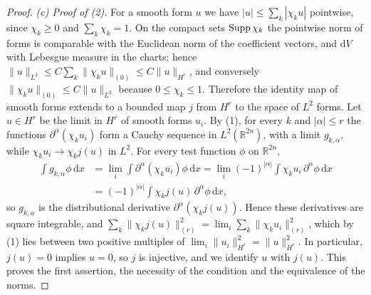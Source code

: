 \begin{proof}
\emph{(c) Proof of (2).} For a smooth form $u$ we have $|u|\leq\sum_k|\chi_ku|$ pointwise, since $\chi_k\geq0$ and $\sum_k\chi_k=1$. On the compact sets $\operatorname{Supp}\chi_k$ the pointwise norm of forms is comparable with the Euclidean norm of the coefficient vectors, and $\mathrm dV$ with Lebesgue measure in the charts; hence $\|u\|_{L^2}\leq C\sum_k\|\chi_ku\|_{(0)}\leq C\|u\|_{H^r}$, and conversely $\|\chi_ku\|_{(0)}\leq C\|u\|_{L^2}$ because $0\leq\chi_k\leq1$. Therefore the identity map of smooth forms extends to a bounded map $j$ from $H^r$ to the space of $L^2$ forms. Let $u\in H^r$ be the limit in $H^r$ of smooth forms $u_i$. By (1), for every $k$ and $|\alpha|\leq r$ the functions $\partial^\alpha(\chi_ku_i)$ form a Cauchy sequence in $L^2(\mathbb R^{2n})$, with a limit $g_{k,\alpha}$, while $\chi_ku_i\to\chi_kj(u)$ in $L^2$. For every test function $\phi$ on $\mathbb R^{2n}$,
\[
 \begin{aligned}
 \int g_{k,\alpha}\phi\,\mathrm dx&=\lim_i\int\partial^\alpha(\chi_ku_i)\phi\,\mathrm dx=\lim_i(-1)^{|\alpha|}\int\chi_ku_i\,\partial^\alpha\phi\,\mathrm dx\\
 &=(-1)^{|\alpha|}\int\chi_kj(u)\,\partial^\alpha\phi\,\mathrm dx,
 \end{aligned}
\]
so $g_{k,\alpha}$ is the distributional derivative $\partial^\alpha(\chi_kj(u))$. Hence these derivatives are square integrable, and $\sum_k\|\chi_kj(u)\|_{(r)}^2=\lim_i\sum_k\|\chi_ku_i\|_{(r)}^2$, which by (1) lies between two positive multiples of $\lim_i\|u_i\|_{H^r}^2=\|u\|_{H^r}^2$. In particular, $j(u)=0$ implies $u=0$, so $j$ is injective, and we identify $u$ with $j(u)$. This proves the first assertion, the necessity of the condition and the equivalence of the norms.


\end{proof}
